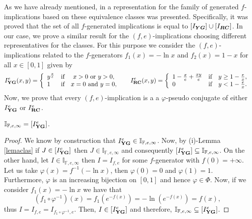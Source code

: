 As we have already mentioned, in \cite{Vemuri2014} a representation for the family of generated $f$-implications based on these equivalence classes was presented. Specifically, it was proved that the set of all $f$-generated implications is equal to $[I_{\bm{YG}}]\cup [I_{\bm{RC}}]$. In our case, we prove a similar result for the $(f,e)$-implications choosing different representatives for the classes. For this purpose we consider the $(f,e)$-implications related to the $f$-generators $f_1(x)=-\ln x$ and $f_2(x)=1-x$ for all $x \in [0,1]$ given by
$$I_{\bf YG}^e(x,y)= \left\{ \begin{array}{lcc}
	y^{\frac{x}{e}} &   \hbox{if}  & x >0 \text{ or } y>0,         \\ 1  & \hbox{if}  & x=0 \text{ and } y=0,
\end{array}
\right.
\hspace{0.5cm}
I_{\bf RC}^e(x,y)= \left\{ \begin{array}{lcc}
	1-\frac{x}{e} + \frac{xy}{e} &   \hbox{if}  & y \geq 1-\frac{e}{x}, \\ 0  & \hbox{if}  & y < 1-\frac{e}{x}.
\end{array}
\right.
$$
Now, we prove that every $(f,e)$-implication is a a $\varphi$-pseudo conjugate of either $I_{\bf YG}^e$ or $I_{\bf RC}^e$.
\begin{theorem} $\mathbb{I}_{\mathbb{F},e,\infty} = [I_{\bf YG}^e]$.
\end{theorem}

\begin{proof}
	We know by construction that $I_{\bf YG}^e \in \mathbb{I}_{\mathbb{F},e,\infty}$. Now, by (i)-Lemma \ref{lemaclas} if $J \in [I_{\bf YG}^e]$ then $J \in \mathbb{I}_{\mathbb{F},e,\infty}$ and consequently $[I_{\bf YG}^e]\subseteq \mathbb{I}_{\mathbb{F},e,\infty}$.
	On the other hand, let $I \in \mathbb{I}_{\mathbb{F},e,\infty}$  then $I=I_{f,e}$ for some $f$-generator with $f(0)=+\infty$. Let us take $\varphi(x)=f^{-1}(-\ln x)$, then $\varphi(0)=0$ and $\varphi(1)=1$. Furthermore, $\varphi$ is  an increasing bijection on $[0,1]$ and hence $\varphi \in \Phi$. Now, if we consider $f_1(x)=-\ln x$ we have that
	$$(f_1 \circ \varphi^{-1})(x)=f_1(e^{-f(x)})=- \ln ( e^{-f(x)})=f(x),$$
	\noindent thus $I=I_{f,e}=I_{f_1 \circ \varphi^{-1},e}$. Then, $I \in [I_{\bf YG}^e]$ and therefore, $ \mathbb{I}_{\mathbb{F},e,\infty} \subseteq [I_{\bf YG}^e]$.
\end{proof}

